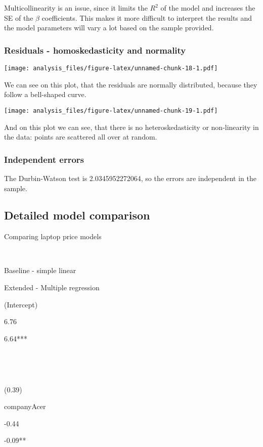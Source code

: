 \documentclass[
]{article}
\begin{document}
Multicollinearity is an issue, since it limits the \(R^2\) of the model
and increases the SE of the \(\beta\) coefficients. This makes it more
difficult to interpret the results and the model parameters will vary a
lot based on the sample provided.

\hypertarget{residuals---homoskedasticity-and-normality}{%
\subsubsection{Residuals - homoskedasticity and
normality}\label{residuals---homoskedasticity-and-normality}}

\texttt{[image: analysis\_files/figure-latex/unnamed-chunk-18-1.pdf]}

We can see on this plot, that the residuals are normally distributed,
because they follow a bell-shaped curve.

\texttt{[image: analysis\_files/figure-latex/unnamed-chunk-19-1.pdf]}

And on this plot we can see, that there is no heteroskedasticity or
non-linearity in the data: points are scattered all over at random.

\hypertarget{independent-errors}{%
\subsubsection{Independent errors}\label{independent-errors}}

The Durbin-Watson test is 2.0345952272064, so the errors are independent
in the sample.

\hypertarget{detailed-model-comparison}{%
\subsection{Detailed model comparison}\label{detailed-model-comparison}}

Comparing laptop price models

~

Baseline - simple linear

Extended - Multiple regression

(Intercept)

6.76

6.64***

~

~

(0.39)

companyAcer

-0.44

-0.09**
\end{document}
